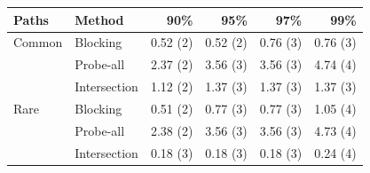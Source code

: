 \begin{tabular}{llrrrr}
\toprule
Paths & Method & 90\% & 95\% & 97\% & 99\%\\
\midrule
Common & Blocking & 0.52 (2) & 0.52 (2) & 0.76 (3) & 0.76 (3)\\
 & Probe-all & 2.37 (2) & 3.56 (3) & 3.56 (3) & 4.74 (4)\\
 & Intersection & 1.12 (2) & 1.37 (3) & 1.37 (3) & 1.37 (3)\\\addlinespace[2pt]
Rare & Blocking & 0.51 (2) & 0.77 (3) & 0.77 (3) & 1.05 (4)\\
 & Probe-all & 2.38 (2) & 3.56 (3) & 3.56 (3) & 4.73 (4)\\
 & Intersection & 0.18 (3) & 0.18 (3) & 0.18 (3) & 0.24 (4)\\
\bottomrule
\end{tabular}
